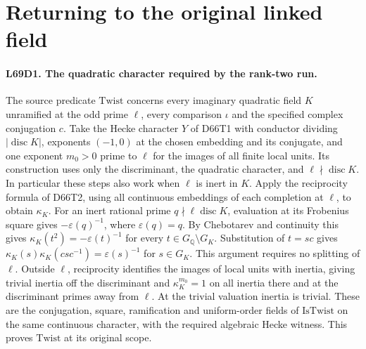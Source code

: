 \section{Returning to the original linked field}

\paragraph{L69D1. The quadratic character required by the rank-two run.}
The source predicate $\mathrm{Twist}$ concerns every imaginary
quadratic field $K$ unramified at the odd prime $\ell$, every
comparison $\iota$ and the specified complex conjugation $c$.
Take the Hecke character $Y$ of D66T1 with conductor dividing
$|\operatorname{disc}K|$, exponents $(-1,0)$ at the chosen
embedding and its conjugate, and one exponent $m_0>0$ prime to
$\ell$ for the images of all finite local units. Its construction
uses only the discriminant, the quadratic character, and
$\ell\nmid\operatorname{disc}K$. In particular these steps also
work when $\ell$ is inert in $K$. Apply the reciprocity formula
of D66T2, using all continuous embeddings of each completion at
$\ell$, to obtain $\kappa_K$. For an inert rational prime
$q\nmid\ell\operatorname{disc}K$, evaluation at its Frobenius
square gives $-\varepsilon(q)^{-1}$, where $\varepsilon(q)=q$.
By Chebotarev and continuity this gives
$\kappa_K(t^2)=-\varepsilon(t)^{-1}$ for every
$t\in G_{\mathbb Q}\setminus G_K$. Substitution of $t=sc$ gives
$\kappa_K(s)\kappa_K(csc^{-1})=\varepsilon(s)^{-1}$ for
$s\in G_K$. This argument requires no splitting of $\ell$.
Outside $\ell$, reciprocity identifies the images of local units
with inertia, giving trivial inertia off the discriminant and
$\kappa_K^{m_0}=1$ on all inertia there and at the discriminant
primes away from $\ell$. At the trivial valuation inertia is
trivial. These are the conjugation, square, ramification and
uniform-order fields of $\mathrm{IsTwist}$ on the same continuous
character, with the required algebraic Hecke witness. This proves
$\mathrm{Twist}$ at its original scope.


